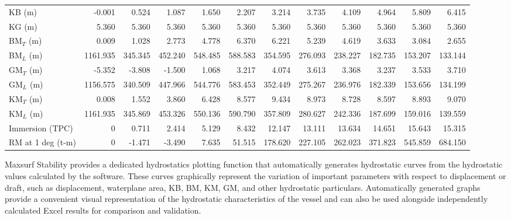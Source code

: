 \documentclass[12pt,a4paper,twoside]{report}
\begin{document}
\begin{table}[H]
{\begin{tabular}{lrrrrrrrrrrr}
KB (m)
& -0.001 & 0.524 & 1.087 & 1.650 & 2.207 & 3.214 & 3.735 & 4.109 & 4.964 & 5.809 & 6.415 \\

KG (m)
& 5.360 & 5.360 & 5.360 & 5.360 & 5.360 & 5.360 & 5.360 & 5.360 & 5.360 & 5.360 & 5.360 \\

BM$_T$ (m)
& 0.009 & 1.028 & 2.773 & 4.778 & 6.370 & 6.221 & 5.239 & 4.619 & 3.633 & 3.084 & 2.655 \\

BM$_L$ (m)
& 1161.935 & 345.345 & 452.240 & 548.485 & 588.583 & 354.595 & 276.093 & 238.227 & 182.735 & 153.207 & 133.144 \\

GM$_T$ (m)
& -5.352 & -3.808 & -1.500 & 1.068 & 3.217 & 4.074 & 3.613 & 3.368 & 3.237 & 3.533 & 3.710 \\

GM$_L$ (m)
& 1156.575 & 340.509 & 447.966 & 544.776 & 583.453 & 352.449 & 275.267 & 236.976 & 182.339 & 153.656 & 134.199 \\

KM$_T$ (m)
& 0.008 & 1.552 & 3.860 & 6.428 & 8.577 & 9.434 & 8.973 & 8.728 & 8.597 & 8.893 & 9.070 \\

KM$_L$ (m)
& 1161.935 & 345.869 & 453.326 & 550.136 & 590.790 & 357.809 & 280.627 & 242.336 & 187.699 & 159.016 & 139.559 \\

Immersion (TPC)
& 0 & 0.711 & 2.414 & 5.129 & 8.432 & 12.147 & 13.111 & 13.634 & 14.651 & 15.643 & 15.315 \\

RM at 1 deg (t-m)
& 0 & -1.471 & -3.490 & 7.635 & 51.515 & 178.620 & 227.105 & 262.023 & 371.823 & 545.859 & 684.150 \\

\hline
\end{tabular}%
}
\end{table}

\vspace{\baselineskip}\par\noindent Maxsurf Stability provides a dedicated hydrostatics plotting function that automatically generates hydrostatic curves from the hydrostatic values calculated by the software. These curves graphically represent the variation of important parameters with respect to displacement or draft, such as displacement, waterplane area, KB, BM, KM, GM, and other hydrostatic particulars. Automatically generated graphs provide a convenient visual representation of the hydrostatic characteristics of the vessel and can also be used alongside independently calculated Excel results for comparison and validation.
\end{document}
